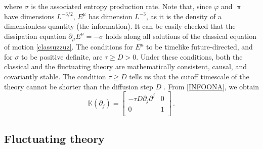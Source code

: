 \documentclass[a4paper, amsfonts, amssymb, amsmath, reprint, showkeys, nofootinbib, twoside,notitlepage,onecolumn]{revtex4-2}
\newcommand{\Ka}{{\mathbb{K}}}
\theoremstyle{definition}
\begin{document}
where $\sigma$ is the associated entropy production rate. Note that, since $\varphi$ and $\uppi$ have dimensions $L^{-3/2}$, $E^\mu$ has dimension $L^{-3}$, as it is the density of a dimensionless quantity (the information). It can be easily checked that the dissipation equation $\partial_\mu E^\mu=-\sigma$ holds along all solutions of the classical equation of motion \eqref{classuzzuz}. The conditions for $E^\mu$ to be timelike future-directed, and for $\sigma$ to be positive definite, are $\tau \geq D>0$. Under these conditions, both the classical and the fluctuating theory are mathematically consistent, causal, and covariantly stable. The condition $\tau \geq D$ tells us that the cutoff timescale of the theory cannot be shorter than the diffusion step $D$ \cite{Hartman:2017hhp}. From \eqref{INFOONA}, we obtain
\begin{equation}
    \Ka(\partial_j) = 
    \begin{bmatrix}
        -\tau D \partial_j \partial^j & 0\\
        0 & 1 \\
    \end{bmatrix} \, .
\end{equation}


\subsection{Fluctuating theory}\label{flucttuuttuioz}
\end{document}
